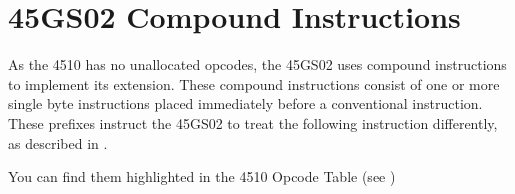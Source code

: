 \section{45GS02 Compound Instructions}

As the 4510 has no unallocated opcodes, the 45GS02 uses compound instructions
to implement its extension.  These compound instructions consist of one or
more single byte instructions placed immediately before a conventional
instruction.  These prefixes instruct the 45GS02 to treat the following instruction
differently, as described in .

You can find them highlighted in the 4510 Opcode Table (see )






\endgroup